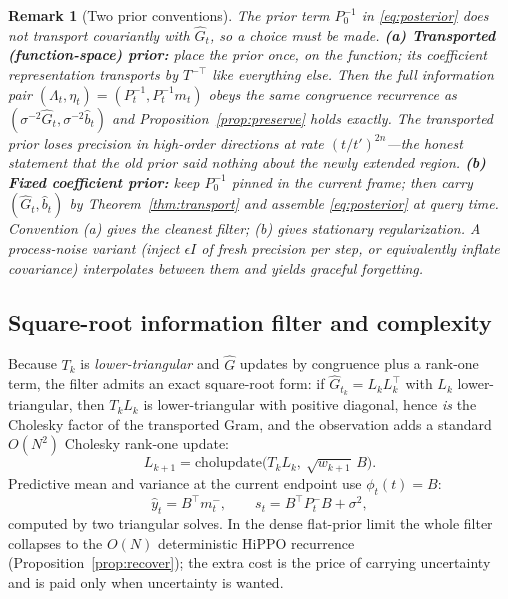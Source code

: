 \documentclass[11pt]{article}
\newtheorem{remark}{Remark}
\newcommand{\Gh}{\widehat{G}}
\newcommand{\bh}{\widehat{b}}
\begin{document}
\begin{remark}[Two prior conventions]\label{rem:priors}
The prior term $P_0^{-1}$ in \eqref{eq:posterior} does not transport covariantly with $\Gh_t$, so a choice must be made. \textbf{(a) Transported (function-space) prior:} place the prior once, on the function; its coefficient representation transports by $T^{-\top}$ like everything else. Then the full information pair $(\Lambda_t,\eta_t)=(P_t^{-1},P_t^{-1}m_t)$ obeys the same congruence recurrence as $(\sigma^{-2}\Gh_t,\sigma^{-2}\bh_t)$ and Proposition~\ref{prop:preserve} holds exactly. The transported prior loses precision in high-order directions at rate $(t/t')^{2n}$---the honest statement that the old prior said nothing about the newly extended region. \textbf{(b) Fixed coefficient prior:} keep $P_0^{-1}$ pinned in the current frame; then carry $(\Gh_t,\bh_t)$ by Theorem~\ref{thm:transport} and assemble \eqref{eq:posterior} at query time. Convention (a) gives the cleanest filter; (b) gives stationary regularization. A process-noise variant (inject $\epsilon I$ of fresh precision per step, or equivalently inflate covariance) interpolates between them and yields graceful forgetting.
\end{remark}

\subsection{Square-root information filter and complexity}\label{sec:srif}

Because $T_k$ is \emph{lower-triangular} and $\Gh$ updates by congruence plus a rank-one term, the filter admits an exact square-root form: if $\Gh_{t_k}=L_kL_k^\top$ with $L_k$ lower-triangular, then $T_kL_k$ is lower-triangular with positive diagonal, hence \emph{is} the Cholesky factor of the transported Gram, and the observation adds a standard $O(N^2)$ Cholesky rank-one update:
\begin{equation}
    L_{k+1}=\mathrm{cholupdate}\big(T_kL_k,\ \sqrt{w_{k+1}}\,B\big).
\end{equation}
Predictive mean and variance at the current endpoint use $\phi_{t}(t)=B$:
\begin{equation}
    \widehat y_{t}=B^\top m^-_{t},\qquad
    s_{t}=B^\top P^-_{t}B+\sigma^2,
\end{equation}
computed by two triangular solves. In the dense flat-prior limit the whole filter collapses to the $O(N)$ deterministic HiPPO recurrence (Proposition~\ref{prop:recover}); the extra cost is the price of carrying uncertainty and is paid only when uncertainty is wanted.
\end{document}
